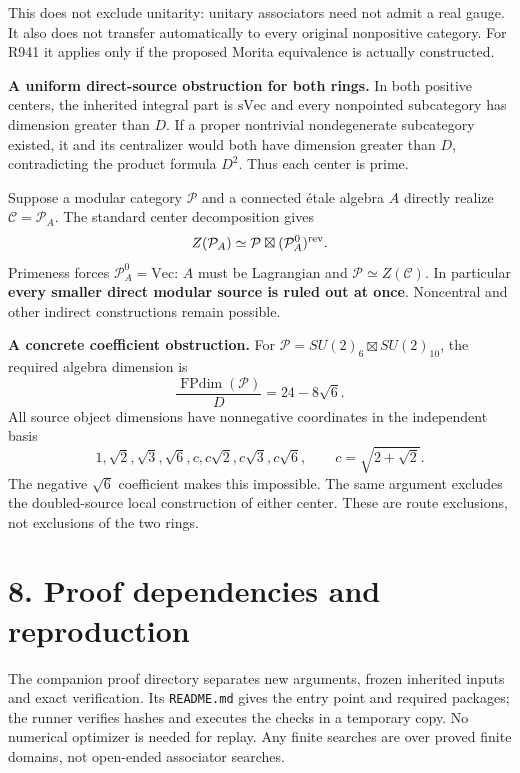 \documentclass[11pt,a4paper]{article}
\newcommand{\FP}{\operatorname{FPdim}}
\newcommand{\R}[1]{\texttt{#1}}
\begin{document}
This does not exclude unitarity: unitary associators need not admit a real gauge. It also does not transfer automatically to every original nonpositive category. For R941 it applies only if the proposed Morita equivalence is actually constructed.

\textbf{A uniform direct-source obstruction for both rings.} In both positive centers, the inherited integral part is $\mathrm{sVec}$ and every nonpointed subcategory has dimension greater than $D$. If a proper nontrivial nondegenerate subcategory existed, it and its centralizer would both have dimension greater than $D$, contradicting the product formula $D^2$. Thus each center is prime.

Suppose a modular category $\mathcal P$ and a connected étale algebra $A$ directly realize $\mathcal C=\mathcal P_A$. The standard center decomposition gives
\[
Z(\mathcal P_A)\simeq\mathcal P\boxtimes(\mathcal P_A^0)^{\rm rev}.
\]
Primeness forces $\mathcal P_A^0=\mathrm{Vec}$: $A$ must be Lagrangian and $\mathcal P\simeq Z(\mathcal C)$. In particular \textbf{every smaller direct modular source is ruled out at once}. Noncentral and other indirect constructions remain possible.

\textbf{A concrete coefficient obstruction.} For $\mathcal P=SU(2)_6\boxtimes SU(2)_{10}$, the required algebra dimension is
\[
\frac{\FP(\mathcal P)}D=24-8\sqrt6.
\]
All source object dimensions have nonnegative coordinates in the independent basis
\[
1,\sqrt2,\sqrt3,\sqrt6,c,c\sqrt2,c\sqrt3,c\sqrt6,\qquad c=\sqrt{2+\sqrt2}.
\]
The negative $\sqrt6$ coefficient makes this impossible. The same argument excludes the doubled-source local construction of either center. These are route exclusions, not exclusions of the two rings.

\newpage
\section*{8. Proof dependencies and reproduction}
The companion proof directory separates new arguments, frozen inherited inputs and exact verification. Its \R{README.md} gives the entry point and required packages; the runner verifies hashes and executes the checks in a temporary copy. No numerical optimizer is needed for replay. Any finite searches are over proved finite domains, not open-ended associator searches.
\end{document}
